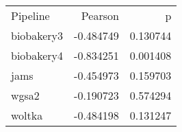 \begin{tabular}{lrr}
Pipeline & Pearson & p \\
biobakery3 & -0.484749 & 0.130744 \\
biobakery4 & -0.834251 & 0.001408 \\
jams & -0.454973 & 0.159703 \\
wgsa2 & -0.190723 & 0.574294 \\
woltka & -0.484198 & 0.131247 \\
\end{tabular}
